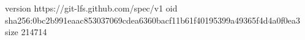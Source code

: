 version https://git-lfs.github.com/spec/v1
oid sha256:0bc2b991eaac853037069cdea6360bacf11b61f40195399a49365f4d4a0f0ea3
size 214714
